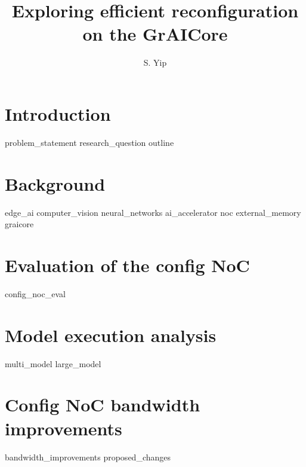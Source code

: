 \documentclass[11pt]{report}
\title{Exploring efficient reconfiguration on the GrAICore}
\author{S. Yip}
\begin{document}
\onehalfspacing




\tableofcontents




\chapter{Introduction}
{problem_statement}
{research_question}
{outline}

\chapter{Background}
{edge_ai}
{computer_vision}
{neural_networks}
{ai_accelerator}
{noc}
{external_memory}
{graicore}

\chapter{Evaluation of the config NoC}
{config_noc_eval}

\chapter{Model execution analysis}
{multi_model}
{large_model}

\chapter{Config NoC bandwidth improvements}
{bandwidth_improvements}
{proposed_changes}
\end{document}
